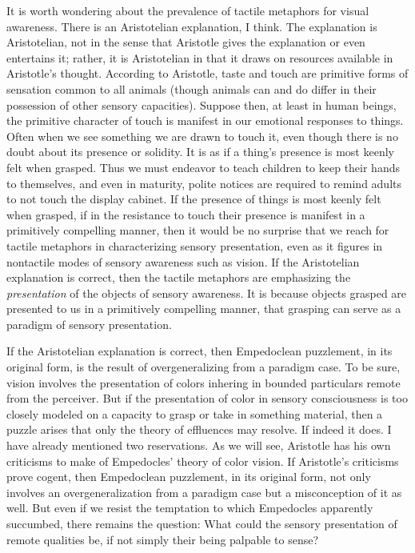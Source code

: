\documentclass[12pt]{article}
\begin{document}
It is worth wondering about the prevalence of tactile metaphors for visual awareness. There is an Aristotelian explanation, I think. The explanation is Aristotelian, not in the sense that Aristotle gives the explanation or even entertains it; rather, it is Aristotelian in that it draws on resources available in Aristotle's thought. According to Aristotle, taste and touch are primitive forms of sensation common to all animals (though animals can and do differ in their possession of other sensory capacities). Suppose then, at least in human beings, the primitive character of touch is manifest in our emotional responses to things. Often when we see something we are drawn to touch it, even though there is no doubt about its presence or solidity. It is as if a thing's presence is most keenly felt when grasped. Thus we must endeavor to teach children to keep their hands to themselves, and even in maturity, polite notices are required to remind adults to not touch the display cabinet. If the presence of things is most keenly felt when grasped, if in the resistance to touch their presence is manifest in a primitively compelling manner, then it would be no surprise that we reach for tactile metaphors in characterizing sensory presentation, even as it figures in nontactile modes of sensory awareness such as vision. If the Aristotelian explanation is correct, then the tactile metaphors are emphasizing the \emph{presentation} of the objects of sensory awareness. It is because objects grasped are presented to us in a primitively compelling manner, that grasping can serve as a paradigm of sensory presentation. 

If the Aristotelian explanation is correct, then Empedoclean puzzlement, in its original form,  is the result of overgeneralizing from a paradigm case. To be sure, vision involves the presentation of colors inhering in bounded particulars remote from the perceiver. But if the presentation of color in sensory consciousness is too closely modeled on a capacity to grasp or take in something material, then a puzzle arises that only the theory of effluences may resolve. If indeed it does. I have already mentioned two reservations. As we will see, Aristotle has his own criticisms to make of Empedocles' theory of color vision. If Aristotle's criticisms prove cogent, then Empedoclean puzzlement, in its original form, not only involves an overgeneralization from a paradigm case but a misconception of it as well. But even if we resist the temptation to which Empedocles apparently succumbed, there remains the question: What could the sensory presentation of remote qualities be, if not simply their being palpable to sense?
\end{document}
